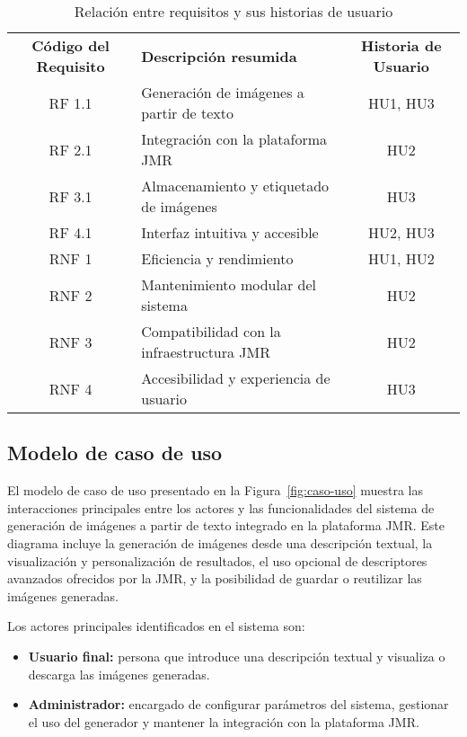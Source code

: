 \begin{table}[H]
    \centering
    \renewcommand{\arraystretch}{1.4}
    \begin{tabular}{cp{6cm}c}
        \rowcolor{gray!30}
        \textbf{Código del Requisito} & \textbf{Descripción resumida} & \textbf{Historia de Usuario} \\
        \rowcolor{gray!10}
        RF 1.1 & Generación de imágenes a partir de texto & HU1, HU3 \\
        \addlinespace
        RF 2.1 & Integración con la plataforma JMR & HU2 \\
        \rowcolor{gray!10}
        RF 3.1 & Almacenamiento y etiquetado de imágenes & HU3 \\
        \addlinespace
        RF 4.1 & Interfaz intuitiva y accesible & HU2, HU3 \\
        \rowcolor{gray!10}
        RNF 1 & Eficiencia y rendimiento & HU1, HU2 \\
        \addlinespace
        RNF 2 & Mantenimiento modular del sistema & HU2 \\
        \rowcolor{gray!10}
        RNF 3 & Compatibilidad con la infraestructura JMR & HU2 \\
        \addlinespace
        RNF 4 & Accesibilidad y experiencia de usuario & HU3 \\
    \end{tabular}
    \caption{Relación entre requisitos y sus historias de usuario}
    \label{tab:req-hu}
\end{table}

\subsection{Modelo de caso de uso}
El modelo de caso de uso presentado en la Figura~\ref{fig:caso-uso} muestra las interacciones principales entre los actores y las funcionalidades del sistema de generación de imágenes a partir de texto integrado en la plataforma JMR. Este diagrama incluye la generación de imágenes desde una descripción textual, la visualización y personalización de resultados, el uso opcional de descriptores avanzados ofrecidos por la JMR, y la posibilidad de guardar o reutilizar las imágenes generadas.

Los actores principales identificados en el sistema son:
\begin{itemize}
    \item \textbf{Usuario final:} persona que introduce una descripción textual y visualiza o descarga las imágenes generadas.
    \item \textbf{Administrador:} encargado de configurar parámetros del sistema, gestionar el uso del generador y mantener la integración con la plataforma JMR.
\end{itemize}

